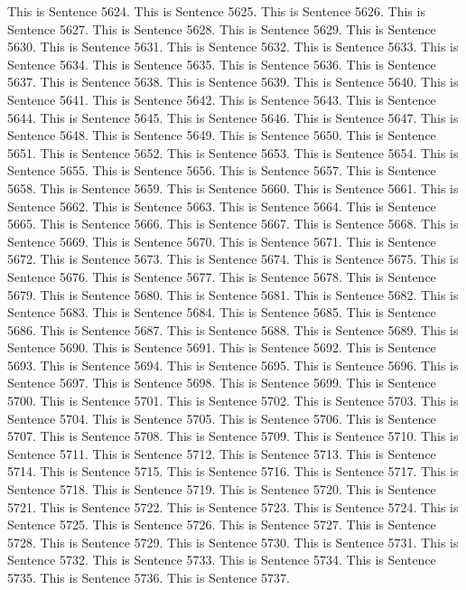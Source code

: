 \documentclass{article}
\begin{document}
This is Sentence 5624.
This is Sentence 5625.
This is Sentence 5626.
This is Sentence 5627.
This is Sentence 5628.
This is Sentence 5629.
This is Sentence 5630.
This is Sentence 5631.
This is Sentence 5632.
This is Sentence 5633.
This is Sentence 5634.
This is Sentence 5635.
This is Sentence 5636.
This is Sentence 5637.
This is Sentence 5638.
This is Sentence 5639.
This is Sentence 5640.
This is Sentence 5641.
This is Sentence 5642.
This is Sentence 5643.
This is Sentence 5644.
This is Sentence 5645.
This is Sentence 5646.
This is Sentence 5647.
This is Sentence 5648.
This is Sentence 5649.
This is Sentence 5650.
This is Sentence 5651.
This is Sentence 5652.
This is Sentence 5653.
This is Sentence 5654.
This is Sentence 5655.
This is Sentence 5656.
This is Sentence 5657.
This is Sentence 5658.
This is Sentence 5659.
This is Sentence 5660.
This is Sentence 5661.
This is Sentence 5662.
This is Sentence 5663.
This is Sentence 5664.
This is Sentence 5665.
This is Sentence 5666.
This is Sentence 5667.
This is Sentence 5668.
This is Sentence 5669.
This is Sentence 5670.
This is Sentence 5671.
This is Sentence 5672.
This is Sentence 5673.
This is Sentence 5674.
This is Sentence 5675.
This is Sentence 5676.
This is Sentence 5677.
This is Sentence 5678.
This is Sentence 5679.
This is Sentence 5680.
This is Sentence 5681.
This is Sentence 5682.
This is Sentence 5683.
This is Sentence 5684.
This is Sentence 5685.
This is Sentence 5686.
This is Sentence 5687.
This is Sentence 5688.
This is Sentence 5689.
This is Sentence 5690.
This is Sentence 5691.
This is Sentence 5692.
This is Sentence 5693.
This is Sentence 5694.
This is Sentence 5695.
This is Sentence 5696.
This is Sentence 5697.
This is Sentence 5698.
This is Sentence 5699.
This is Sentence 5700.
This is Sentence 5701.
This is Sentence 5702.
This is Sentence 5703.
This is Sentence 5704.
This is Sentence 5705.
This is Sentence 5706.
This is Sentence 5707.
This is Sentence 5708.
This is Sentence 5709.
This is Sentence 5710.
This is Sentence 5711.
This is Sentence 5712.
This is Sentence 5713.
This is Sentence 5714.
This is Sentence 5715.
This is Sentence 5716.
This is Sentence 5717.
This is Sentence 5718.
This is Sentence 5719.
This is Sentence 5720.
This is Sentence 5721.
This is Sentence 5722.
This is Sentence 5723.
This is Sentence 5724.
This is Sentence 5725.
This is Sentence 5726.
This is Sentence 5727.
This is Sentence 5728.
This is Sentence 5729.
This is Sentence 5730.
This is Sentence 5731.
This is Sentence 5732.
This is Sentence 5733.
This is Sentence 5734.
This is Sentence 5735.
This is Sentence 5736.
This is Sentence 5737.
\end{document}
